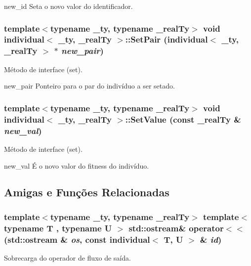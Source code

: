 new\_\-id Seta o novo valor do identificador. \hypertarget{classindividual_a07dd69312bd76a2046ca3331b769023d}{
\subsubsection[{SetPair}]{\setlength{\rightskip}{0pt plus 5cm}template$<$typename \_\-ty, typename \_\-realTy$>$ void {\bf individual}$<$ \_\-ty, \_\-realTy $>$::SetPair ({\bf individual}$<$ \_\-ty, \_\-realTy $>$ $\ast$ {\em new\_\-pair})}}
\label{classindividual_a07dd69312bd76a2046ca3331b769023d}
Método de interface (set).

new\_\-pair Ponteiro para o par do indivíduo a ser setado. \hypertarget{classindividual_a906863b234c66ce3a45cab44c85ef385}{
\subsubsection[{SetValue}]{\setlength{\rightskip}{0pt plus 5cm}template$<$typename \_\-ty, typename \_\-realTy$>$ void {\bf individual}$<$ \_\-ty, \_\-realTy $>$::SetValue (const \_\-realTy \& {\em new\_\-val})}}
\label{classindividual_a906863b234c66ce3a45cab44c85ef385}
Método de interface (set).

new\_\-val É o novo valor do fitness do indivíduo. 

\subsection{Amigas e Funções Relacionadas}
\hypertarget{classindividual_a90bc9541f07077cb6af916fd8dd2eca2}{
\subsubsection[{operator$<$$<$}]{\setlength{\rightskip}{0pt plus 5cm}template$<$typename \_\-ty, typename \_\-realTy$>$ template$<$typename T , typename U $>$ std::ostream\& operator$<$$<$ (std::ostream \& {\em os}, \/  const {\bf individual}$<$ T, U $>$ \& {\em id})}}
\label{classindividual_a90bc9541f07077cb6af916fd8dd2eca2}
Sobrecarga do operador de fluxo de saída.


